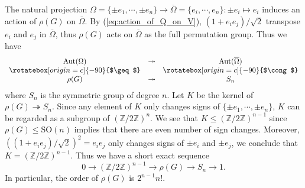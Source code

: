 \documentclass{amsart}
\theoremstyle{definition}
\theoremstyle{remark}
\numberwithin{equation}{section}
\begin{document}
The natural projection 
$\Omega = \{ \pm e_1 , \cdots , \pm e_n \} \to 
\overline{\Omega} = \{ e_i , \cdots , e_n \} :
\pm e_i \mapsto e_i$ induces an action of $\rho(G)$ on $\overline{\Omega}$.
By (\ref{eq:action_of_Q_on_V}), $(1 + e_i e_j)/\sqrt{2}$ transpose $e_i$ and $e_j$ 
in $\overline{\Omega}$, thus $\rho(G)$ acts on $\overline{\Omega}$ 
as the full permutation group. Thus we have
\[
\begin{array}{ccc}
\mathrm{Aut} (\Omega) & \twoheadrightarrow & \mathrm{Aut} (\overline{\Omega}) \\
\rotatebox[origin=c]{-90}{$\geq$} & & \rotatebox[origin=c]{-90}{$\cong$} \\
\rho(G) & \twoheadrightarrow & S_n
\end{array}
\]
where $S_n$ is the symmetric group of degree $n$.
Let $K$ be the kernel of $\rho(G) \twoheadrightarrow S_n$.
Since any element of $K$ only changes signs of $\{ \pm e_1 , \cdots , \pm e_n\}$, 
$K$ can be regarded as a subgroup of $(\mathbb{Z} / 2 \mathbb{Z})^n$.
We see that $K \leq (\mathbb{Z} / 2 \mathbb{Z})^{n-1}$ 
since $\rho(G) \leq \mathrm{SO}(n)$ implies that there are even number of sign changes.
Moreover, $((1 + e_i e_j)/\sqrt{2} )^2 = e_i e_j$ only changes signs of 
$\pm e_i$ and $\pm e_j$, we conclude that $K = (\mathbb{Z} / 2 \mathbb{Z})^{n-1}$.
Thus we have a short exact sequence 
\begin{equation}
\label{eq:short_exact_sequence_for_rho(G)}
0 \to (\mathbb{Z} / 2 \mathbb{Z})^{n-1} \to \rho(G) \to S_n \to 1.
\end{equation}
In particular, the order of $\rho(G)$ is $2^{n-1} n!$.
\end{document}
